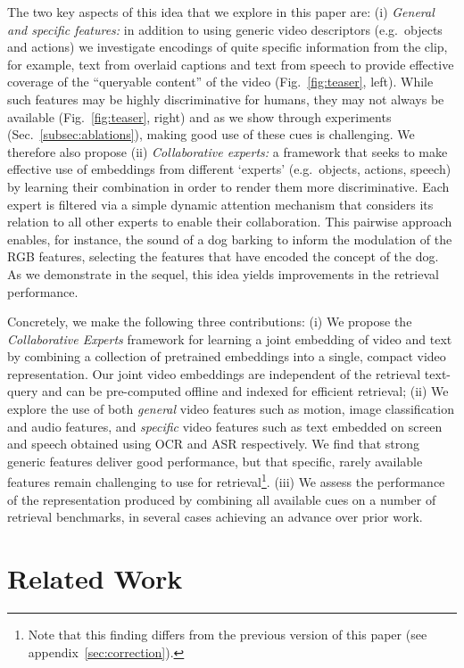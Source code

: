 \documentclass{bmvc2k}
\begin{document}
The two key aspects of this idea that we explore in this paper are: (i) {\em General and specific features:}  in addition to using generic video descriptors (e.g.\ objects and actions) we investigate encodings of quite specific information from the clip, for example, text from overlaid captions and text from speech to provide effective coverage of the ``queryable content'' of the video (Fig.~\ref{fig:teaser}, left). While such features may be highly discriminative for humans, they may not always be available (Fig.~\ref{fig:teaser}, right) and as we show through experiments (Sec.~\ref{subsec:ablations}), making good use of these cues is challenging. We therefore also propose (ii) {\em Collaborative experts:} a framework that seeks to make effective use of embeddings from different `experts' (e.g.\ objects, actions, speech) by learning their combination in order to render them more discriminative. Each expert is filtered via a simple dynamic attention mechanism that considers its relation to all other experts to enable their collaboration. This pairwise approach enables, for instance, the sound of a dog barking to inform the modulation of the RGB features, selecting the features that have encoded the concept of the dog. As we demonstrate in the sequel, this idea yields improvements in the retrieval performance.

Concretely, we make the following three contributions: 
(i) We propose the \textit{Collaborative Experts} framework for learning a joint embedding of video and text by combining a collection of pretrained embeddings into a single, compact video representation. Our joint video embeddings are independent of the retrieval text-query and can be pre-computed offline and indexed for efficient retrieval; 
(ii) We explore the use of both \textit{general} video features such as motion, image classification and audio features, and \textit{specific} video features such as text embedded on screen and speech obtained using OCR and ASR respectively. We find that strong generic features deliver good performance, but that specific, rarely available features remain challenging to use for retrieval\footnote{Note that this finding differs from the previous version of this paper (see appendix~\ref{sec:correction}).}.  
(iii) We assess the performance of the representation produced by combining all available cues on a number of retrieval benchmarks, in several cases achieving an advance over prior work. \section{Related Work} 
\end{document}

